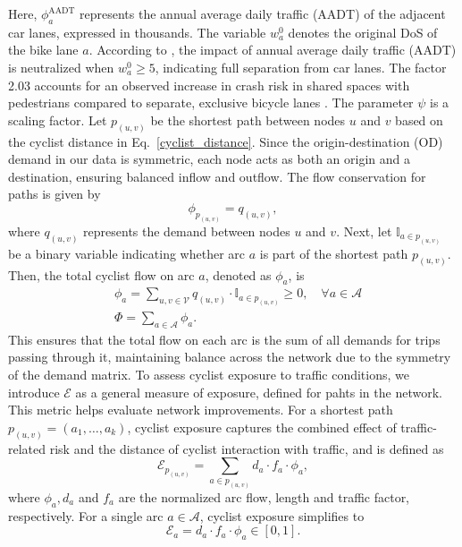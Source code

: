 \documentclass[lettersize,journal]{IEEEtran}
\begin{document}
Here, $\phi^{\text{AADT}}_{a}$ represents the annual average daily traffic (AADT) of the adjacent car lanes, expressed in thousands. The variable $w_{a}^{0}$ denotes the original DoS of the bike lane $a$. According to \cite{cyclerap2024}, the impact of annual average daily traffic (AADT) is neutralized when $w_{a}^{0} \geq 5$, indicating full separation from car lanes. The factor 2.03 accounts for an observed increase in crash risk in shared spaces with pedestrians compared to separate, exclusive bicycle lanes \cite{mesimaki2021near}. The parameter $\psi$ is a scaling factor.  
Let $p_{(u,v)}$ be the shortest path between nodes $u$ and $v$ based on the cyclist distance in Eq.~\eqref{cyclist_distance}. Since the origin-destination (OD) demand in our data is symmetric, each node acts as both an origin and a destination, ensuring balanced inflow and outflow. The flow conservation for paths is given by
\begin{equation}
\label{eq_shortest_path}
    \phi_{p_{(u,v)}} = q_{(u,v)},
\end{equation}
where $q_{(u,v)}$ represents the demand between nodes $u$ and $v$.  
Next, let $\mathbb{I}_{a \in p_{(u,v)}}$ be a binary variable indicating whether arc $a$ is part of the shortest path $p_{(u,v)}$. Then, the total cyclist flow on arc $a$, denoted as $\phi_a$, is
\begin{equation}
\begin{aligned}
\label{eq_flows}
  & \phi_{a}  = \sum_{u,v \in \mathcal{V}} q_{(u,v)} \cdot \mathbb{I}_{a \in p_{(u,v)}} \geq 0, \quad \forall a \in \mathcal{A}  \\
  & \Phi  = \sum_{a \in \mathcal{A}} \phi_{a}.
\end{aligned}
\end{equation}
This ensures that the total flow on each arc is the sum of all demands for trips passing through it, maintaining balance across the network due to the symmetry of the demand matrix. To assess cyclist exposure to traffic conditions, we introduce $\mathcal{E}$ as a general measure of exposure, defined for pahts in the network. This metric helps evaluate network improvements. For a shortest path $p_{(u,v)} = (a_1, \dots, a_k)$, cyclist exposure captures the combined effect of traffic-related risk and the distance of cyclist interaction with traffic, and is defined as
\begin{equation}
\label{exposure_def}
    \mathcal{E}_{p_{(u,v)}} = \sum_{a \in p_{(u,v)}} d_{a} \cdot f_{a} \cdot \phi_{a},
\end{equation}
where $\phi_{a}, d_{a}$ and $f_{a}$ are the normalized arc flow, length and traffic factor, respectively. For a single arc $a \in \mathcal{A}$, cyclist exposure simplifies to
\begin{equation}
\label{arc_exposure}
    \mathcal{E}_{a} = d_{a} \cdot f_{a} \cdot \phi_{a} \in  \left [ 0,1 \right ].
\end{equation}
\end{document}

